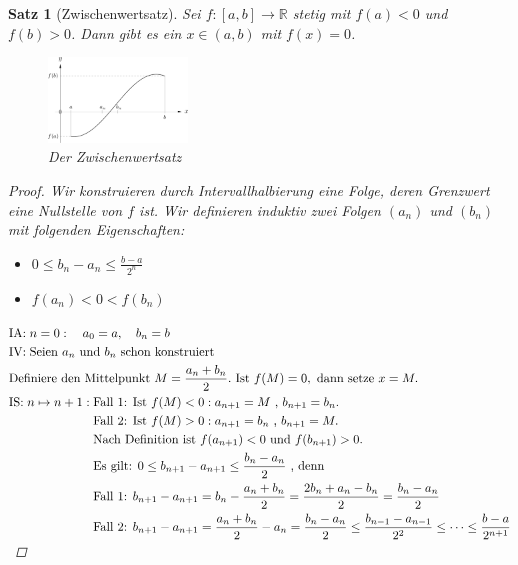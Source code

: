 \documentclass[a4paper,titlepage,oneside]{article}
\def\R{\ensuremath{\mathbb{R}} }
\newcommand{\IA}[1][n=0]{\vspace{0.1pt}\ensuremath{\text{IA:}\sp#1:}}
\newcommand{\IV}{\vspace{0.1pt}\ensuremath{\text{IV:}\sp}}
\newcommand{\IS}[1][n \mapsto n+1]{\vspace{0.1pt}\ensuremath{\text{IS:}\sp#1:}}
\def\sp{\hspace{0,1cm}}
\theoremstyle{thmstyle}
\newtheorem{satz}{Satz}[section]
\theoremstyle{subthmstyle}
\begin{document}
\begin{satz}[Zwischenwertsatz]
Sei $f:[a,b] \to \R$ stetig mit $f(a) < 0$ und $f(b) > 0$. Dann gibt es ein $ x \in (a,b)$ mit $f(x) = 0$.
\begin{figure}[ht]\centering
 \includegraphics[width=0.33\textwidth]{images/zwischenwertsatz.png}
\caption{Der Zwischenwertsatz}
\end{figure}
\begin{proof}
Wir konstruieren durch Intervallhalbierung eine Folge, deren Grenzwert eine Nullstelle von $f$ ist. 
Wir definieren induktiv zwei Folgen $(a_n)$ und $(b_n)$ mit folgenden Eigenschaften:
\begin{itemize}
\item $ \displaystyle 0 \le b_n - a_n \le \frac{b-a}{2^n}$
\item $ \displaystyle f(a_n) < 0 < f(b_n)$
\end{itemize}
\begin{math}\displaystyle \begin{aligned}[t]
&\IA \quad a_0 = a, \quad b_n = b \\
&\IV{\text{Seien $a_n$ und $b_n$ schon konstruiert}} \\
&\text{Definiere den Mittelpunkt }M = \frac{a_n + b_n}{2}. \text{ Ist } f(M) = 0, \text{ dann setze } x = M .\\
&\IS \begin{aligned}[t] &\text{Fall 1: Ist } f(M) < 0 : a_{n+1} = M \text{ , } b_{n+1} = b_n. \\
&\text{Fall 2: Ist } f(M) > 0 : a_{n+1} = b_n \text{ , } b_{n+1} = M.  \\
&\text{Nach Definition ist } f(a_{n+1}) < 0 \text{ und } f(b_{n+1}) > 0. \\
&\text{Es gilt: } 0 \le b_{n+1} - a_{n+1} \le \frac{b_n - a_n}{2} \text{ , denn} \\
&\text{Fall 1: } b_{n+1} - a_{n+1} = b_n - \frac{a_n+b_n}{2} = \frac{2b_n + a_n - b_n}{2} = \frac{b_n - a_n}{2} \\
&\text{Fall 2: } b_{n+1} - a_{n+1} = \frac{a_n+b_n}{2} - a_n = \frac{b_n - a_n}{2} \le \frac{b_{n-1} - a_{n-1}}{2^2} \le \dots \le \frac{b-a}{2^{n+1}} \\
\end{aligned}\end{aligned}\\

\end{math}
\end{proof}
\end{satz}
\end{document}
